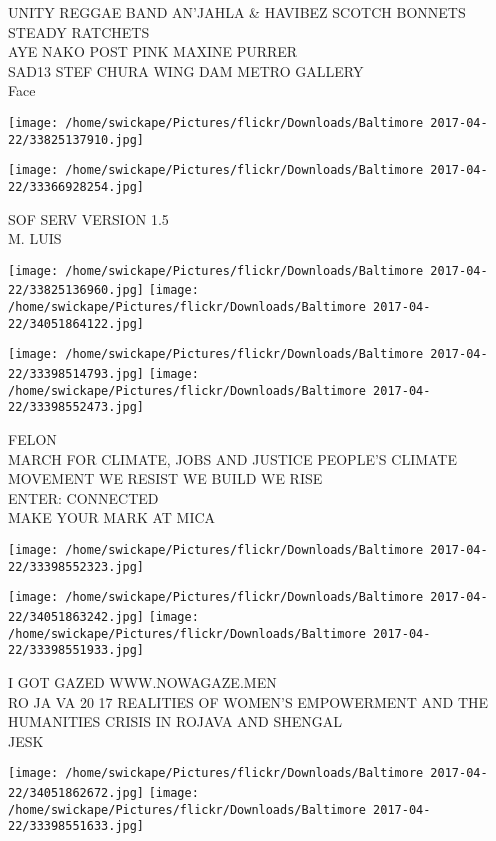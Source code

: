 \documentclass[10pt,letterpaper]{article}
\begin{document}
UNITY REGGAE BAND AN'JAHLA \& HAVIBEZ SCOTCH BONNETS STEADY RATCHETS\\
AYE NAKO POST PINK MAXINE PURRER\\
SAD13 STEF CHURA WING DAM METRO GALLERY\\
Face
\pagebreak

\texttt{[image: /home/swickape/Pictures/flickr/Downloads/Baltimore 2017-04-22/33825137910.jpg]}

\vspace{0.25in}
\texttt{[image: /home/swickape/Pictures/flickr/Downloads/Baltimore 2017-04-22/33366928254.jpg]}

SOF SERV VERSION 1.5\\
M. LUIS
\pagebreak

\texttt{[image: /home/swickape/Pictures/flickr/Downloads/Baltimore 2017-04-22/33825136960.jpg]}
\texttt{[image: /home/swickape/Pictures/flickr/Downloads/Baltimore 2017-04-22/34051864122.jpg]}

\texttt{[image: /home/swickape/Pictures/flickr/Downloads/Baltimore 2017-04-22/33398514793.jpg]}
\texttt{[image: /home/swickape/Pictures/flickr/Downloads/Baltimore 2017-04-22/33398552473.jpg]}

FELON\\
MARCH FOR CLIMATE, JOBS AND JUSTICE PEOPLE'S CLIMATE MOVEMENT WE RESIST WE BUILD WE RISE\\
ENTER: CONNECTED\\
MAKE YOUR MARK AT MICA
\pagebreak

\texttt{[image: /home/swickape/Pictures/flickr/Downloads/Baltimore 2017-04-22/33398552323.jpg]}

\vspace{0.25in}
\texttt{[image: /home/swickape/Pictures/flickr/Downloads/Baltimore 2017-04-22/34051863242.jpg]}
\texttt{[image: /home/swickape/Pictures/flickr/Downloads/Baltimore 2017-04-22/33398551933.jpg]}

I GOT GAZED WWW.NOWAGAZE.MEN\\
RO JA VA 20 17 REALITIES OF WOMEN'S EMPOWERMENT AND THE HUMANITIES CRISIS IN ROJAVA AND SHENGAL\\
JESK
\pagebreak

\texttt{[image: /home/swickape/Pictures/flickr/Downloads/Baltimore 2017-04-22/34051862672.jpg]}
\texttt{[image: /home/swickape/Pictures/flickr/Downloads/Baltimore 2017-04-22/33398551633.jpg]}
\end{document}
